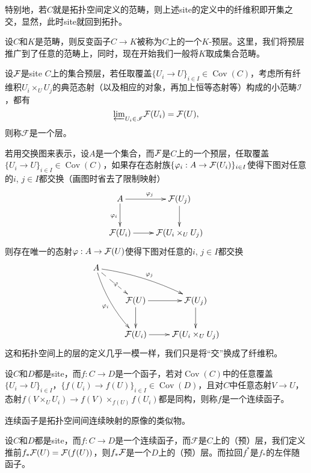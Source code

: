 特别地，若$C$就是拓扑空间定义的范畴，则上述site的定义中的纤维积即开集之交，显然，此时site就回到拓扑。

\begin{para}[预层]
	设$C$和$K$是范畴，则反变函子$C\to K$被称为$C$上的一个$K$-预层。这里，我们将预层推广到了任意的范畴上，同时，现在开始我们一般将$K$取成集合范畴。
\end{para}

\begin{para}[层]
	设$\mathcal{F}$是site $C$上的集合预层，若任取覆盖$\{U_i\to U\}_{i\in I}\in \operatorname{Cov}(C)$，考虑所有纤维积$U_i\times_U U_j$的典范态射（以及相应的对象，再加上恒等态射等）构成的小范畴$\mathscr I$，都有
	\[
	{\varprojlim}_{U_i \in \mathscr{I}}\mathcal{F}(U_i)=\mathcal{F}(U),
	\]
	则称$\mathcal F$是一个层。
	
	若用交换图来表示，设$A$是一个集合，而$\mathcal{F}$是$C$上的一个预层，任取覆盖$\{U_i\to U\}_{i\in I}\in \operatorname{Cov}(C)$，如果存在态射族$\{\varphi_i:A\to \mathcal{F}(U_i)\}_{i\in I}$使得下图对任意的$i$, $j\in I$都交换（画图时省去了限制映射）
	\[
		\xymatrix{
			A\ar[r]^{\varphi_{j}}\ar[d]_{\varphi_{i}}&\calf(U_j)\ar[d]\\
			\calf(U_i)\ar[r]&\calf(U_{i}\times_U U_{j})
		}
	\]
	则存在唯一的态射$\varphi:A\to \mathcal{F}(U)$使得下图对任意的$i$, $j\in I$都交换
	\[
		\xymatrix{
			A\ar@/_/[ddr]_{\varphi_{i}}\ar@/^/[drr]^{\varphi_{j}}\ar@{-->}[dr]|{\varphi}&& \\
			&\calf(U)\ar[r]\ar[d]&\calf(U_j)\ar[d]\\
			&\calf(U_i)\ar[r]&\calf(U_{i}\times_U U_{j})
		}
	\]
	这和拓扑空间上的层的定义几乎一模一样，我们只是将“交”换成了纤维积。
\end{para}

\begin{para}[连续函子]
	设$C$和$D$都是site，而$f:C\to D$是一个函子，若对$\operatorname{Cov}(C)$中的任意覆盖$\{U_i\to U\}_{i\in I}$，$\{f(U_i)\to f(U)\}_{i\in I}\in \operatorname{Cov}(D)$，且对$C$中任意态射$V\to U$，态射$f(V\times_U U_i)\to f(V)\times_{f(U)}f(U_i)$都是同构，则称$f$是一个连续函子。
\end{para}

连续函子是拓扑空间间连续映射的原像的类似物。

\begin{para}[推前与拉回]
	设$C$和$D$都是site，而$f:C\to D$是一个连续函子，而$\mathcal F$是$C$上的（预）层，我们定义推前$f_*\mathcal{F}(U)=\mathcal{F}(f(U))$，则$f_*\mathcal{F}$是一个$D$上的（预）层。而拉回$f^*$是$f_*$的左伴随函子。
\end{para}

